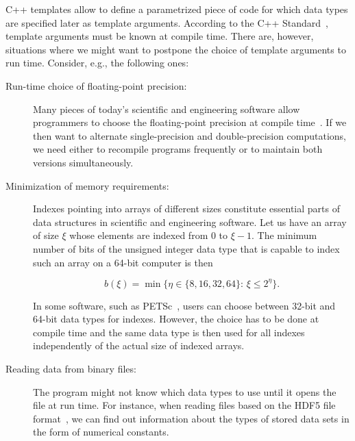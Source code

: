 \documentclass[10pt,a4paper]{article}
\theoremstyle{definition}\newtheorem{problem}{Problem}
\begin{document}
C++ templates allow to define a parametrized piece of code for which data types are specified later as template arguments. According to the C++ Standard~\cite{RefWorks:73}, template arguments must be known at compile time. There are, however, situations where we might want to postpone the choice of template arguments to run time. Consider, e.g., the following ones:
\begin{description}

\item[Run-time choice of floating-point precision:] Many pieces of today's scientific and engineering software allow programmers to choose the floating-point precision at compile time~\cite{RefWorks:74,RefWorks:78,RefWorks:58,RefWorks:35,RefWorks:5}. If we then want to alternate single-precision and double-precision computations, we need either to recompile programs frequently or to maintain both versions simultaneously.

\item[Minimization of memory requirements:] Indexes pointing into arrays of different sizes constitute essential parts of data structures in scientific and engineering software. Let us have an array of size $\xi$ whose elements are indexed from 0 to $\xi-1$. The minimum number of bits of the unsigned integer data type that is capable to index such an array on a 64-bit computer is then

\begin{equation}
\label{eq:1}
b(\xi)=\min\bigl\{\eta\in\{8,16,32,64\}:\,\xi\leq 2^\eta\bigr\}.
\end{equation}

In some software, such as PETSc~\cite{RefWorks:78}, users can choose between 32-bit and 64-bit data types for indexes. However, the choice has to be done at compile time and the same data type is then used for all indexes independently of the actual size of indexed arrays.

\item[Reading data from binary files:] The program might not know which data types to use until it opens the file at run time. For instance, when reading files based on the HDF5 file format~\cite{RefWorks:38}, we can find out information about the types of stored data sets in the form of numerical constants.

\end{description}
\end{document}
